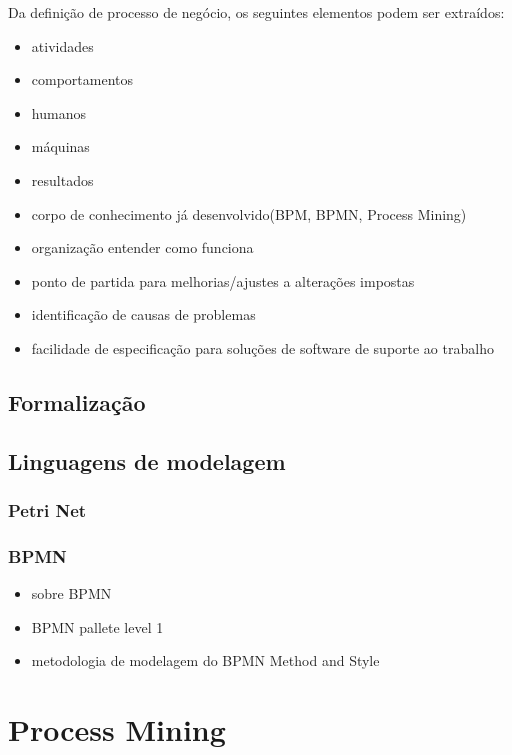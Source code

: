 \documentclass[a4paper]{article}
\begin{document}
Da definição de processo de negócio, os seguintes elementos podem ser extraídos:
\begin{itemize}
\item atividades
\item comportamentos
\item humanos
\item máquinas
\item resultados
\end{itemize}

\begin{itemize}
\item corpo de conhecimento já desenvolvido(BPM, BPMN, Process Mining)
\item organização entender como funciona
\item ponto de partida para melhorias/ajustes a alterações impostas
\item identificação de causas de problemas
\item facilidade de especificação para soluções de software de suporte ao trabalho
\end{itemize}

\subsection{Formalização}
\cite{PM_form}
\subsection{Linguagens de modelagem}

\subsubsection{Petri Net}
\cite{PM_book}

\subsubsection{BPMN}
\begin{itemize}
\item sobre BPMN
\item BPMN pallete level 1
\item metodologia de modelagem do BPMN Method and Style
\end{itemize}

\section{Process Mining}
\end{document}
